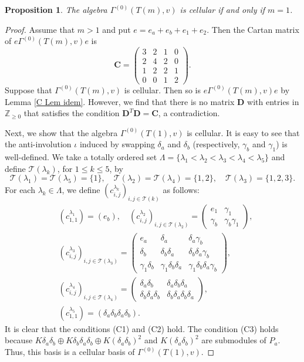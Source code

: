 \documentclass[12pt]{amsart}
\newtheorem{prop}[thm]{Proposition}
\numberwithin{equation}{thm}
\newcommand\ZZ{\mathbb Z}
\newcommand\bC{\mathbf C}
\newcommand\bD{\mathbf D}
\newcommand\cT{\mathcal{T}}
\newcommand\la{\lambda}
\begin{document}
\begin{prop}
\label{D II}
The algebra $\Gamma^{(0)}(T(m),v)$ is cellular if and only if $m=1$.
\end{prop}
\begin{proof} 
Assume that $m>1$ and put $e=e_a+e_b+e_1+e_2$. Then the Cartan matrix of $e\Gamma^{(0)}(T(m),v)e$ is 
\[ \bC=\begin{pmatrix}
3 & 2 & 1 & 0 \\
2 & 4 & 2 & 0 \\
1 & 2 & 2 & 1  \\
0 & 0 & 1 & 2 
\end{pmatrix}. \]
Suppose that $\Gamma^{(0)}(T(m),v)$ is cellular. Then so is $e\Gamma^{(0)}(T(m),v)e$ by Lemma \ref{C Lem idem}. 
However, we find that there is no matrix $\bD$ with entries in $\ZZ_{\ge0}$ that satisfies the condition $\bD^T\bD=\bC$, a contradiction.

Next, we show that the algebra $\Gamma^{(0)}(T(1),v)$ is cellular. It is easy to see that the anti-involution $\iota$  
induced by swapping $\delta_{a}$ and $\delta_{b}$ (respectively, $\gamma_{b}$ and $\gamma_1$) is well-defined. 
We take a totally ordered set 
$\Lambda=\{\lambda_1<\lambda_2<\lambda_3<\lambda_4<\lambda_5\}$ and define $\cT(\lambda_k)$, for $1 \le k \le 5$, by
\[  \cT(\lambda_1)=\cT(\lambda_5)=\{1\}, \quad \cT(\lambda_2)=\cT(\lambda_4)=\{1,2\},\quad \cT(\lambda_3)=\{1,2,3\}. \]
For each $\lambda_k\in\Lambda$, we define $(c^{\lambda_k}_{i,j})_{i,j\in\cT(k)}$ as follows:
\begin{align*}
& (c^{\lambda_1}_{1,1})=(e_{b}), \quad (c^{\lambda_2}_{i,j})_{i,j\in\cT(\la_2)}=
\begin{pmatrix} e_1 & \gamma_1 \\ \gamma_{b} & \gamma_{b}\gamma_1 \end{pmatrix}, \\[7pt]
& (c^{\lambda_3}_{i,j})_{i,j\in\cT(\la_3)}=
\begin{pmatrix} e_{a} & \delta_{a} & \delta_{a}\gamma_{b} \\ \delta_{b} & \delta_{b}\delta_{a} & \delta_{b}\delta_{a}\gamma_{b} \\ 
\gamma_1\delta_{b} & \gamma_1\delta_{b}\delta_{a} & \gamma_1\delta_{b}\delta_{a}\gamma_{b} \end{pmatrix}, \\[7pt]
& (c^{\lambda_4}_{i,j})_{i,j\in\cT(\la_4)}=
\begin{pmatrix} \delta_{a}\delta_{b} & \delta_{a}\delta_{b}\delta_{a} \\ \delta_{b}\delta_{a}\delta_{b} & \delta_{b}\delta_{a}\delta_{b}\delta_{a} \end{pmatrix}, \\[9pt]
& (c^{\lambda_5}_{1,1})=(\delta_{a}\delta_{b}\delta_{a}\delta_{b}). 
\end{align*}
It is clear that the conditions (C1) and (C2) hold. The condition (C3) holds because 
$K\delta_a\delta_b\oplus K\delta_b\delta_a\delta_b\oplus K(\delta_a\delta_b)^2$ and $K(\delta_a\delta_b)^2$ 
are submodules of $P_a$. Thus, this basis is a cellular basis of $\Gamma^{(0)}(T(1),v)$.
\end{proof}
\end{document}
